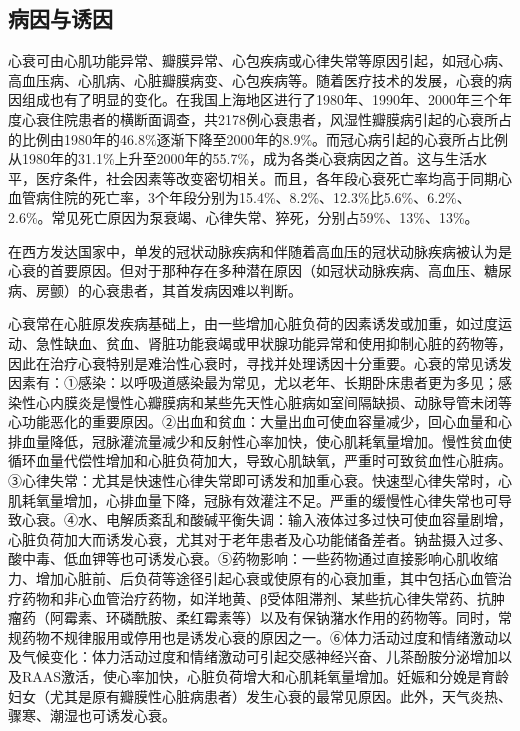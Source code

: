 \subsection{病因与诱因}

心衰可由心肌功能异常、瓣膜异常、心包疾病或心律失常等原因引起，如冠心病、高血压病、心肌病、心脏瓣膜病变、心包疾病等。随着医疗技术的发展，心衰的病因组成也有了明显的变化。在我国上海地区进行了1980年、1990年、2000年三个年度心衰住院患者的横断面调查，共2178例心衰患者，风湿性瓣膜病引起的心衰所占的比例由1980年的46.8\%逐渐下降至2000年的8.9\%。而冠心病引起的心衰所占比例从1980年的31.1\%上升至2000年的55.7\%，成为各类心衰病因之首。这与生活水平，医疗条件，社会因素等改变密切相关。而且，各年段心衰死亡率均高于同期心血管病住院的死亡率，3个年段分别为15.4\%、8.2\%、12.3\%比5.6\%、6.2\%、2.6\%。常见死亡原因为泵衰竭、心律失常、猝死，分别占59\%、13\%、13\%。

在西方发达国家中，单发的冠状动脉疾病和伴随着高血压的冠状动脉疾病被认为是心衰的首要原因。但对于那种存在多种潜在原因（如冠状动脉疾病、高血压、糖尿病、房颤）的心衰患者，其首发病因难以判断。

心衰常在心脏原发疾病基础上，由一些增加心脏负荷的因素诱发或加重，如过度运动、急性缺血、贫血、肾脏功能衰竭或甲状腺功能异常和使用抑制心脏的药物等，因此在治疗心衰特别是难治性心衰时，寻找并处理诱因十分重要。心衰的常见诱发因素有：①感染：以呼吸道感染最为常见，尤以老年、长期卧床患者更为多见；感染性心内膜炎是慢性心瓣膜病和某些先天性心脏病如室间隔缺损、动脉导管未闭等心功能恶化的重要原因。②出血和贫血：大量出血可使血容量减少，回心血量和心排血量降低，冠脉灌流量减少和反射性心率加快，使心肌耗氧量增加。慢性贫血使循环血量代偿性增加和心脏负荷加大，导致心肌缺氧，严重时可致贫血性心脏病。③心律失常：尤其是快速性心律失常即可诱发和加重心衰。快速型心律失常时，心肌耗氧量增加，心排血量下降，冠脉有效灌注不足。严重的缓慢性心律失常也可导致心衰。④水、电解质紊乱和酸碱平衡失调：输入液体过多过快可使血容量剧增，心脏负荷加大而诱发心衰，尤其对于老年患者及心功能储备差者。钠盐摄入过多、酸中毒、低血钾等也可诱发心衰。⑤药物影响：一些药物通过直接影响心肌收缩力、增加心脏前、后负荷等途径引起心衰或使原有的心衰加重，其中包括心血管治疗药物和非心血管治疗药物，如洋地黄、β受体阻滞剂、某些抗心律失常药、抗肿瘤药（阿霉素、环磷酰胺、柔红霉素等）以及有保钠潴水作用的药物等。同时，常规药物不规律服用或停用也是诱发心衰的原因之一。⑥体力活动过度和情绪激动以及气候变化：体力活动过度和情绪激动可引起交感神经兴奋、儿茶酚胺分泌增加以及RAAS激活，使心率加快，心脏负荷增大和心肌耗氧量增加。妊娠和分娩是育龄妇女（尤其是原有瓣膜性心脏病患者）发生心衰的最常见原因。此外，天气炎热、骤寒、潮湿也可诱发心衰。

